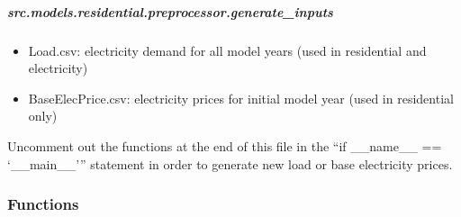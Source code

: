 \documentclass[letterpaper,10pt,english]{sphinxmanual}
\begin{document}
\subparagraph{src.models.residential.preprocessor.generate\_inputs}
\label{\detokenize{src.models.residential.preprocessor.generate_inputs:module-src.models.residential.preprocessor.generate_inputs}}\label{\detokenize{src.models.residential.preprocessor.generate_inputs:src-models-residential-preprocessor-generate-inputs}}\label{\detokenize{src.models.residential.preprocessor.generate_inputs::doc}}\begin{description}
\begin{itemize}
\item {} 
\sphinxAtStartPar
Load.csv: electricity demand for all model years (used in residential and electricity)

\item {} 
\sphinxAtStartPar
BaseElecPrice.csv: electricity prices for initial model year (used in residential only)

\end{itemize}

\end{description}

\sphinxAtStartPar
Uncomment out the functions at the end of this file in the “if \_\_name\_\_ == ‘\_\_main\_\_’” statement
in order to generate new load or base electricity prices.
\subsubsection*{Functions}
\end{document}
